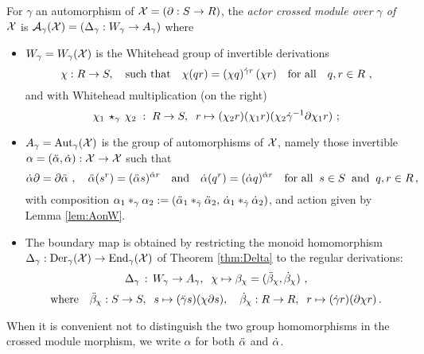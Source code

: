 \begin{defn} 
For $\gamma$ an automorphism of $\mathcal{X} = (\partial : S \to R)$, 
the \emph{actor crossed module over $\gamma$ of $\mathcal{X}$} is 
$\mathcal{A}_{\gamma}(\mathcal{X}) = (\Delta_{\gamma} : W_{\gamma} \to A_{\gamma})$  
where  
\begin{itemize}
\item
$W_{\gamma} = W_{\gamma}(\mathcal{X})$  
is the Whitehead group of invertible derivations
\begin{equation} \label{eq:der-rule}
\chi : R \to S, \quad \mbox{such that} \quad
\chi(qr) = (\chi q)^{\dot{\gamma} r}\,(\chi r)
\quad\mbox{for all}\quad
q,r \in R~,
\end{equation}
and with Whitehead multiplication (on the right)
\begin{equation} \label{eq:W-mult}
\chi_1 \,\star_{\gamma}\, \chi_2 \;:\; R \to S, \;\;
r \mapsto (\chi_2 r)(\chi_1 r)(\chi_2\dot{\gamma}^{-1}\partial\chi_1 r)~;
\end{equation}
\item
$A_{\gamma} = \mathrm{Aut}_{\gamma}(\mathcal{X})$  is the group of automorphisms of  $\mathcal{X}$,
namely those invertible  $\alpha = (\ddot{\alpha},\dot{\alpha}) : \mathcal{X} \to \mathcal{X}$  such that
$$
\dot{\alpha} \partial = \partial \ddot{\alpha}~, \quad
\ddot{\alpha}(s^r) = (\ddot{\alpha} s)^{\dot{\alpha} r}
\quad \mbox{and} \quad
\dot{\alpha}(q^r) = (\dot{\alpha} q)^{\dot{\alpha} r}
\quad \mbox{for all} \;\;
s \in S \;\; \mbox{and} \;\; q,r \in R\,, 
$$ 
with composition \quad 
$\alpha_1 \ast_{\gamma} \alpha_2 
:= (\ddot{\alpha}_1 \ast_{\ddot{\gamma}} \ddot{\alpha}_2,\, \dot{\alpha}_1 \ast_{\dot{\gamma}} \dot{\alpha}_2)$, 
and action given by Lemma \ref{lem:AonW}. 
\item 
The boundary map is obtained by restricting the monoid homomorphism 
$\Delta_{\gamma} : \mathrm{Der}_{\gamma}(\mathcal{X}) \to \mathrm{End}_{\gamma}(\mathcal{X})$  
of Theorem \ref{thm:Delta} to the regular derivations: 
$$
\Delta_{\gamma} \,:\, W_{\gamma} \to A_{\gamma}, \;\; \chi \mapsto 
   \beta_{\chi} = (\ddot{\beta}_{\chi}, \dot{\beta}_{\chi})~,
$$
\begin{equation} \label{eq:actor-bdy}
\mbox{where} \quad
\ddot{\beta}_{\chi} : S \to S, \;\; s \mapsto (\ddot{\gamma} s)(\chi \partial s), \quad
  \dot{\beta}_{\chi} : R \to R, \;\; r \mapsto (\dot{\gamma} r)(\partial \chi r)\,.
\end{equation}
\end{itemize}
\end{defn}

When it is convenient not to distinguish the two group homomorphisms
in the crossed module morphism,
we write  $\alpha$  for both  $\ddot{\alpha}$  and  $\dot{\alpha}$.

